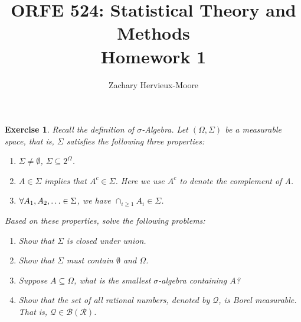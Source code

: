 \documentclass[12pt]{article}
\title{ORFE 524: Statistical Theory and Methods \\ Homework 1}
\author{Zachary Hervieux-Moore}
\date{\displaydate{date}}
\theoremstyle{colon}
\newtheorem{exercise}{Exercise}
\begin{document}
\maketitle

\clearpage

\begin{exercise}
  Recall the definition of $\sigma$-Algebra. Let $(\Omega, \Sigma)$ be a measurable space, that is, $\Sigma$ satisfies the following three properties:

  \begin{enumerate}
    \item $\Sigma \neq \emptyset$, $\Sigma \subseteq 2^\Omega$.
    \item $A \in \Sigma$ implies that $A^c \in \Sigma$. Here we use $A^c$ to denote the complement of A.
    \item $\forall A_1, A_2, \mathellipsis \in \Sigma$, we have $\cap_{i \geq 1} A_i \in \Sigma$.
  \end{enumerate}

  \noindent
  Based on these properties, solve the following problems:

  \begin{enumerate}[label=\arabic*)]
    \item Show that $\Sigma$ is closed under union.
    \item Show that $\Sigma$ must contain $\emptyset$ and $\Omega$.
    \item Suppose $A \subseteq \Omega$, what is the smallest $\sigma$-algebra containing $A$?
    \item Show that the set of all rational numbers, denoted by $\mathcal{Q}$, is Borel measurable. That is, $\mathcal{Q} \in \mathcal{B}(\mathcal{R})$.
  \end{enumerate}
\end{exercise}
\end{document}
